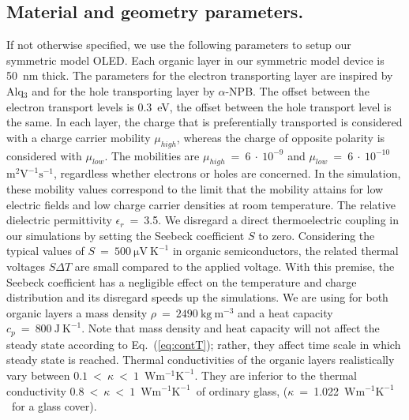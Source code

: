 \documentclass[%
9pt,
 aip,
rsi,%
 amsmath,amssymb,
preprint,%
]{revtex4-1}
\newcommand{\thermalconductivity}{$\mathrm{W m^{-1} K^{-1}}$}
\newcommand{\mobility}{$\mathrm{m^{2} V^{-1} s^{-1}}$}
\begin{document}
\subsection{Material and geometry parameters.}
If not otherwise specified, we use the following parameters to setup our symmetric model OLED.
Each organic layer in our symmetric model device is 50~nm thick. 
The parameters for the electron transporting layer are inspired by Alq$_3$ and for the hole transporting layer by $\alpha$-NPB.
The offset between the electron transport levels is 0.3~eV, the offset between the hole transport level is the same. 
In each layer, the charge that is preferentially transported is considered with a charge carrier mobility $\mu_{high}$, whereas the charge of opposite polarity is considered with $\mu_{low}$. 
The mobilities are $\mu_{high}~=~6~\cdot~10^{-9}$ and $\mu_{low}~=~6~\cdot~10^{-10}$~\mobility, regardless whether electrons or holes are concerned. 
In the simulation, these mobility values correspond to the limit that the mobility attains for low electric fields and low charge carrier densities at room temperature. 
The relative dielectric permittivity $\epsilon_r$~=~3.5.
We disregard a direct thermoelectric coupling in our simulations by setting the Seebeck coefficient $S$ to zero.
Considering the typical values of $S~=~500~\mathrm{\mu V~K^{-1}}$ in organic semiconductors, the related thermal voltages $S \Delta T$ are small compared to the applied voltage.
With this premise, the Seebeck coefficient has a negligible effect on the temperature and charge distribution and its disregard speeds up the simulations. 
%
We are using for both organic layers a mass density $\rho~=~2490~\mathrm{kg~m^{-3}}$ and a heat capacity $c_p~=~800~\mathrm{J~K^{-1}}$.
Note that mass density and heat capacity will not affect the steady state according to Eq.~(\ref{eq:contT}); rather, they affect time scale in which steady state is reached.
Thermal conductivities of the organic layers realistically vary\cite{Reisdorffer2014} between $0.1~<~\kappa~<~1$~\thermalconductivity. They are inferior to the thermal conductivity  $0.8~<~\kappa~<~1$~\thermalconductivity~of ordinary glass,  ($\kappa$~=~1.022~\thermalconductivity~for a glass cover).

\end{document}
